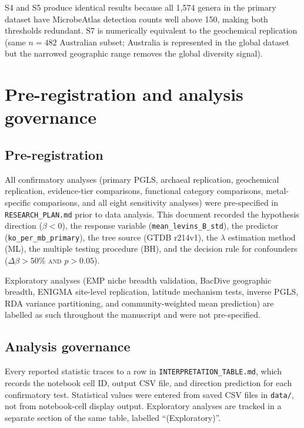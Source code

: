 \documentclass[11pt]{article}
\begin{document}
S4 and S5 produce identical results because all 1,574 genera in the primary
dataset have MicrobeAtlas detection counts well above 150, making both
thresholds redundant.  S7 is numerically equivalent to the geochemical
replication (same $n = 482$ Australian subset; Australia is represented in
the global dataset but the narrowed geographic range removes the global
diversity signal).

\section{Pre-registration and analysis governance}
\label{sm:prereg}

\subsection{Pre-registration}

All confirmatory analyses (primary PGLS, archaeal replication, geochemical
replication, evidence-tier comparisons, functional category comparisons,
metal-specific comparisons, and all eight sensitivity analyses) were
pre-specified in \texttt{RESEARCH\_PLAN.md} prior to data analysis.  This
document recorded the hypothesis direction ($\beta < 0$), the response variable
(\texttt{mean\_levins\_B\_std}), the predictor (\texttt{ko\_per\_mb\_primary}),
the tree source (GTDB r214v1), the $\lambda$ estimation method (ML), the
multiple testing procedure (BH), and the decision rule for confounders
($\Delta\beta > 50\%$ \textsc{and} $p > 0.05$).

Exploratory analyses (EMP niche breadth validation, BacDive geographic breadth,
ENIGMA site-level replication, latitude mechanism tests, inverse PGLS, RDA
variance partitioning, and community-weighted mean prediction) are labelled as
such throughout the manuscript and were not pre-specified.

\subsection{Analysis governance}

Every reported statistic traces to a row in \texttt{INTERPRETATION\_TABLE.md},
which records the notebook cell ID, output CSV file, and direction prediction
for each confirmatory test.  Statistical values were entered from saved CSV
files in \texttt{data/}, not from notebook-cell display output.  Exploratory
analyses are tracked in a separate section of the same table, labelled
``(Exploratory)''.
\end{document}
